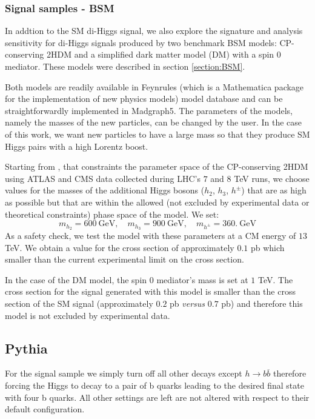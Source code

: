 \subsubsection{Signal samples - BSM} 

In addtion to the SM di-Higgs signal, we also explore the signature and analysis sensitivity for di-Higgs signals produced by two benchmark BSM models: CP-conserving 2HDM and a simplified dark matter model (DM) with a spin 0 mediator. These models were described in section \ref{section:BSM}.

Both models are readily available in Feynrules \cite{Feynrules} (which is a Mathematica package for the implementation of new physics models) model database and can be straightforwardly implemented in Madgraph5. The parameters of the models, namely the masses of the new particles, can be changed by the user. In the case of this work, we want new particles to have a large mass so that they produce SM Higgs pairs with a high Lorentz boost. 

Starting from \cite{2HDMdata}, that constraints the parameter space of the CP-conserving 2HDM using ATLAS and CMS data collected during LHC's $7$ and $8$ TeV runs, we choose values for the masses of the additional Higgs bosons ($h_2$, $h_3$, $h^{\pm}$) that are as high as possible but that are within the allowed (not excluded by experimental data or theoretical constraints) phase space of the model. We set:
\begin{equation}
m_{h_2}=600 ~\text{GeV}, \quad m_{h_3}=900 ~\text{GeV}, \quad m_{h^{\pm}}=360. ~\text{GeV}
\end{equation}
As a safety check, we test the model with these parameters at a CM energy of $13$ TeV. We obtain a value for the cross section of approximately $0.1$ pb which smaller than the current experimental limit on the cross section.

In the case of the DM model, the spin 0 mediator's mass is set at $1$ TeV. The cross section for the signal generated with this model is smaller than the cross section of the SM signal (approximately $0.2$ pb \textit{versus} $0.7$ pb) and therefore this model is not excluded by experimental data.

\subsection{Pythia}

For the signal sample we simply turn off all other decays except $h\rightarrow b\overline{b}$ therefore forcing the Higgs to decay to a pair of b quarks leading to the desired final state with four b quarks. All other settings are left are not altered with respect to their default configuration.

